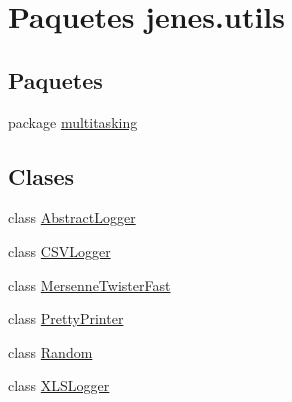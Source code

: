 \hypertarget{namespacejenes_1_1utils}{\section{Paquetes jenes.\-utils}
\label{namespacejenes_1_1utils}
}
\subsection*{Paquetes}
\begin{DoxyCompactItemize}
\item 
package \hyperlink{namespacejenes_1_1utils_1_1multitasking}{multitasking}
\end{DoxyCompactItemize}
\subsection*{Clases}
\begin{DoxyCompactItemize}
\item 
class \hyperlink{classjenes_1_1utils_1_1_abstract_logger}{Abstract\-Logger}
\item 
class \hyperlink{classjenes_1_1utils_1_1_c_s_v_logger}{C\-S\-V\-Logger}
\item 
class \hyperlink{classjenes_1_1utils_1_1_mersenne_twister_fast}{Mersenne\-Twister\-Fast}
\item 
class \hyperlink{classjenes_1_1utils_1_1_pretty_printer}{Pretty\-Printer}
\item 
class \hyperlink{classjenes_1_1utils_1_1_random}{Random}
\item 
class \hyperlink{classjenes_1_1utils_1_1_x_l_s_logger}{X\-L\-S\-Logger}
\end{DoxyCompactItemize}

